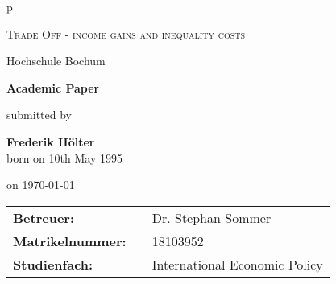 \begin{titlepage}
    \begin{center}
        \begin{tabular}{p{\textwidth}}
    
            \begin{center}
                \LARGE{\textsc{Trade Off - income gains and inequality costs}}\\[1,5cm]
            \end{center}
    
            \begin{center}
                \large{Hochschule Bochum\\[1,5cm]}
            \end{center}
    
            \begin{center}
                \textbf{\Large{Academic Paper\\[1,5 cm]}}
            \end{center}
    
            \begin{center}
                submitted by\\[1,5cm]
            \end{center}
    
            \begin{center}
                \large{\textbf{Frederik Hölter}} \\
                \small{born on 10th May 1995\\[1,5cm]}
            \end{center}
    
            \begin{center}
                \large{on \today}\\[1,5cm]
            \end{center}
    
    
            \begin{center}
                \begin{tabular}{lll}
                \textbf{Betreuer:} & & Dr. Stephan Sommer\\
                \textbf{Matrikelnummer:} & & 18103952\\
                \textbf{Studienfach: } & & International Economic Policy
        \end{tabular}
    \end{center}
    
    \end{tabular}
    \end{center}
\end{titlepage}